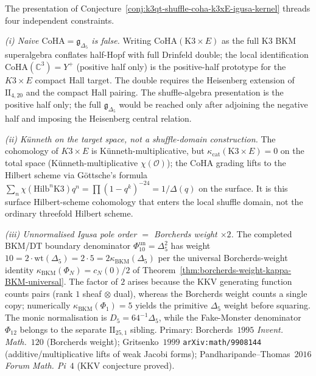 \begin{remark}
\label{rem:k3qt-shuffle-coha-igusa-consistency}
The presentation of
Conjecture~\ref{conj:k3qt-shuffle-coha-k3xE-igusa-kernel}
threads four independent constraints.

\emph{(i) Naive $\mathrm{CoHA} = \mathfrak g_{\Delta_5}$ is false.}
Writing $\mathrm{CoHA}(\mathrm{K3} \times E)$ as the full K3 BKM
superalgebra conflates half-Hopf with full Drinfeld double; the local
identification $\mathrm{CoHA}(\mathbb C^3) = Y^+$ (positive half only)
is the positive-half prototype for the \(K3\times E\) compact Hall
target.
The double requires the Heisenberg extension of \(\mathrm{II}_{4,20}\)
and the compact Hall pairing. The shuffle-algebra presentation is the
positive half only; the full \(\mathfrak g_{\Delta_5}\) would be reached
only after adjoining the negative half and imposing the Heisenberg
central relation.

\emph{(ii) K\"unneth on the target space, not a shuffle-domain
construction.}
The cohomology of \(K3\times E\) is K\"unneth-multiplicative, but
$\kappa_{\mathrm{cat}}(\mathrm{K3} \times E) = 0$ on the total space
(K\"unneth-multiplicative $\chi(\mathcal O)$); the
CoHA grading lifts to the Hilbert scheme via G\"ottsche's formula
$\sum_n \chi(\mathrm{Hilb}^n \mathrm{K3}) q^n = \prod(1 - q^k)^{-24}
= 1/\Delta(q)$ on the surface. It is this surface Hilbert-scheme
cohomology that enters the local shuffle domain, not the ordinary
threefold Hilbert scheme.

\emph{(iii) Unnormalised Igusa pole order $=$ Borcherds weight
$\times 2$.} The completed BKM/DT boundary denominator
$\Phi_{10}^{\mathrm{un}}=\Delta_5^2$ has weight
$10 = 2 \cdot \mathrm{wt}(\Delta_5) = 2 \cdot 5 = 2 \kappa_{\mathrm{BKM}}(\Delta_5)$
per the universal Borcherds-weight identity $\kappa_{\mathrm{BKM}}(\Phi_N) = c_N(0)/2$ of
\cite{VolI}
Theorem~\ref{thm:borcherds-weight-kappa-BKM-universal}. The factor
of $2$ arises because the KKV generating function counts pairs
(rank $1$ sheaf $\otimes$ dual), whereas the Borcherds weight counts
a single copy; numerically $\kappa_{\mathrm{BKM}}(\Phi_1) = 5$
yields the primitive $\Delta_5$ weight before squaring. The monic
normalisation is $D_5=64^{-1}\Delta_5$, while the Fake-Monster
denominator $\Phi_{12}$ belongs to the separate $\mathrm{II}_{25,1}$
sibling.
Primary: Borcherds~$1995$ \emph{Invent. Math.}~$120$
(Borcherds weight); Gritsenko~$1999$
\texttt{arXiv:math/9908144} (additive/multiplicative lifts of weak
Jacobi forms); Pandharipande--Thomas~$2016$ \emph{Forum Math. Pi}~$4$
(KKV conjecture proved).


\end{remark}

